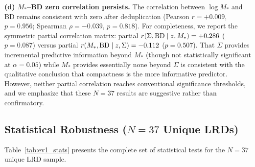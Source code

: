 \documentclass[twocolumn,linenumbers]{aastex631}
\begin{document}
\textbf{(d) $M_*$--BD zero correlation persists.} The correlation between $\log M_*$ and BD remains consistent with zero after deduplication (Pearson $r = +0.009$, $p = 0.956$; Spearman $\rho = -0.039$, $p = 0.818$). For completeness, we report the symmetric partial correlation matrix: partial $r(\Sigma, {\rm BD} \mid z, M_*) = +0.286$ ($p = 0.087$) versus partial $r(M_*, {\rm BD} \mid z, \Sigma) = -0.112$ ($p = 0.507$). That $\Sigma$ provides incremental predictive information beyond $M_*$ (though not statistically significant at $\alpha=0.05$) while $M_*$ provides essentially none beyond $\Sigma$ is consistent with the qualitative conclusion that compactness is the more informative predictor. However, neither partial correlation reaches conventional significance thresholds, and we emphasize that these $N=37$ results are suggestive rather than confirmatory.

\subsection{Statistical Robustness ($N=37$ Unique LRDs)} \label{sec:ev1_stats}

Table~\ref{tab:ev1_stats} presents the complete set of statistical tests for the $N=37$ unique LRD sample.
\end{document}

